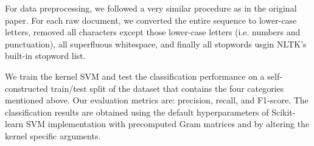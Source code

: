 For data preprocessing, we followed a very similar procedure as in the original paper. For each raw document, we converted the entire sequence to lower-case letters, removed all characters except those lower-case letters (i.e. numbers and punctuation), all superfluous whitespace, and finally all stopwords usgin NLTK's built-in  stopword list.

We train the kernel SVM and test the classification performance on a self-constructed train/test split of the dataset that contains the four categories mentioned above. Our evaluation metrics are: precision, recall, and F1-score. The classification results are obtained using the default hyperparameters of Scikit-learn SVM implementation with precomputed Gram matrices and by altering the kernel specific arguments.
